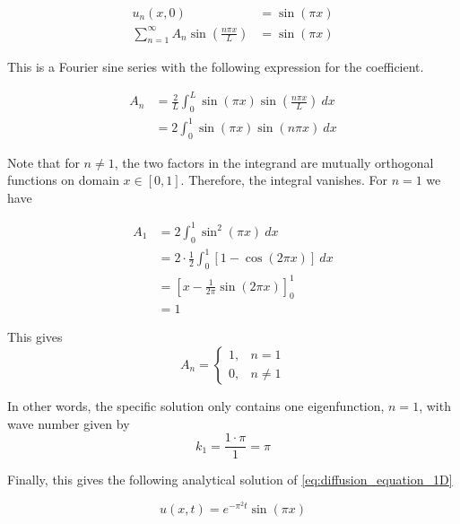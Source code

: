 \documentclass[12pt]{extarticle}
\begin{document}
\begin{align*}
	u_n(x,0) &= \sin(\pi x) \\
	\sum_{n=1}^{\infty} A_n \sin(\frac{n\pi x}{L}) &= \sin(\pi x) 
\end{align*}

This is a Fourier sine series with the following expression for the coefficient.

\begin{align*}
	A_n &= \frac{2}{L} \int_0^L \sin(\pi x)\sin(\frac{n\pi x}{L})\:dx \\
	&= 2 \int_0^1 \sin(\pi x)\sin(n\pi x)\:dx
\end{align*}

Note that for $n \ne 1$, the two factors in the integrand are mutually orthogonal functions on domain $x \in [0,1]$. Therefore, the integral vanishes. For $n=1$ we have

\begin{align*}
	A_1 &= 2 \int_0^1 \sin^2(\pi x)\:dx \\
	&= 2\cdot \frac{1}{2} \int_0^1 [1 - \cos(2\pi x)]\:dx \\
	&= [x - \frac{1}{2\pi}\sin(2\pi x)]_0^1 \\
	&= 1
\end{align*}

This gives
\[ A_n = \begin{cases}
	1, & n=1 \\
	0, & n\ne 1
\end{cases} \]

In other words, the specific solution only contains one eigenfunction, $n=1$, with wave number given by
\[ k_1 = \frac{1\cdot \pi}{1} = \pi \]

Finally, this gives the following analytical solution of \eqref{eq:diffusion_equation_1D}

\[ u(x,t) = e^{-\pi^2 t} \sin(\pi x) \]
\end{document}
